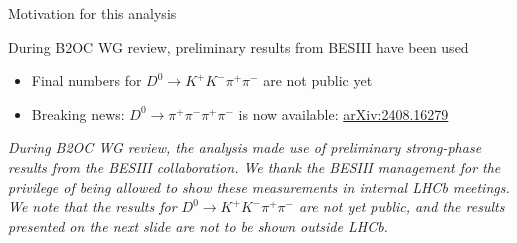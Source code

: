 \documentclass[xcolor={dvipsnames}]{beamer}
\begin{document}
\begin{frame}{Motivation for this analysis}
  \begin{center}
    During B2OC WG review, preliminary results from BESIII have been used
  \end{center}
  \begin{itemize}
    \item{Final numbers for $D^0\to K^+K^-\pi^+\pi^-$ are not public yet}
    \item{Breaking news: $D^0\to\pi^+\pi^-\pi^+\pi^-$ is now available: \href{https://arxiv.org/abs/2408.16279}{arXiv:2408.16279}}
  \end{itemize}
  \vspace{0.3cm}
  \begin{center}
    \textit{\color{blue}During B2OC WG review, the analysis made use of preliminary strong-phase results from the BESIII collaboration. We thank the BESIII management for the privilege of being allowed to show these measurements in internal LHCb meetings. We note that the results for $D^0\to K^+K^-\pi^+\pi^-$ are not yet public, and the results presented on the next slide are not to be shown outside LHCb.}
  \end{center}
\end{frame}
\end{document}
